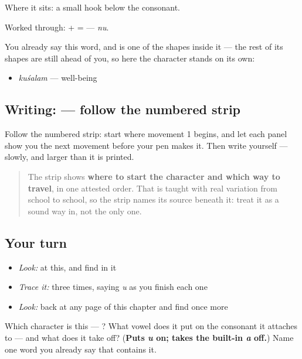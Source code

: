 Where it sits: a small hook below the consonant.

Worked through: \textbf{} + \textbf{} = \textbf{} — \emph{nu}.

You already say this word, and  is one of the shapes inside it — the rest of its shapes are still ahead of you, so here the character stands on its own:

\begin{itemize}
\raggedright
  \item \emph{kuśalam} — well-being
\end{itemize}

\subsection*{Writing:  — follow the numbered strip}

Follow the numbered strip: start where movement 1 begins, and let each panel show you the next movement before your pen makes it. Then write  yourself — slowly, and larger than it is printed.

\begin{quote}
The strip shows \textbf{where to start the character and which way to travel}, in one attested order. That is taught with real variation from school to school, so the strip names its source beneath it: treat it as a sound way in, not the only one.
\end{quote}

\subsection*{Your turn}
\begin{itemize}
\raggedright
  \item \emph{Look:} at this, and find  in it
\end{itemize}

\begin{quote}
\end{quote}

\begin{itemize}
\raggedright
  \item \emph{Trace it:}  three times, saying \emph{u} as you finish each one
  \item \emph{Look:} back at any page of this chapter and find  once more
\end{itemize}

\begin{tcolorbox}[breakable,colback=teal!4,colframe=teal!35!black,title={Before you move on}]
Which character is this — ? What vowel does it put on the consonant it attaches to — and what does it take off? (\textbf{Puts \emph{u} on; takes the built-in \emph{a} off.}) Name one word you already say that contains it.
\end{tcolorbox}
